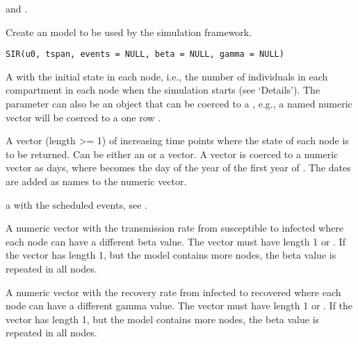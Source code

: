 \documentclass[letterpaper]{book}
\begin{document}
%
\begin{SeeAlso}
 and .
\end{SeeAlso}
%
\begin{Description}
Create an  model to be used by the simulation
framework.
\end{Description}
%
\begin{Usage}
\begin{verbatim}
SIR(u0, tspan, events = NULL, beta = NULL, gamma = NULL)
\end{verbatim}
\end{Usage}
%
\begin{Arguments}
\begin{ldescription}
\item[\code{u0}] A  with the initial state in each node,
i.e., the number of individuals in each compartment in each
node when the simulation starts (see `Details'). The
parameter  can also be an object that can be coerced
to a , e.g., a named numeric vector will be
coerced to a one row .

\item[\code{tspan}] A vector (length >= 1) of increasing time points
where the state of each node is to be returned. Can be either
an  or a  vector. A 
vector is coerced to a numeric vector as days, where
 becomes the day of the year of the first year
of . The dates are added as names to the numeric
vector.

\item[\code{events}] a  with the scheduled events, see
.

\item[\code{beta}] A numeric vector with the transmission rate from
susceptible to infected where each node can have a different
beta value. The vector must have length 1 or .
If the vector has length 1, but the model contains more nodes,
the beta value is repeated in all nodes.

\item[\code{gamma}] A numeric vector with the recovery rate from infected
to recovered where each node can have a different gamma
value. The vector must have length 1 or . If
the vector has length 1, but the model contains more nodes,
the beta value is repeated in all nodes.
\end{ldescription}
\end{Arguments}
\end{document}
